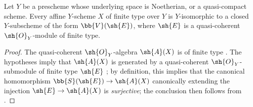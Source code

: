 \begin{proposition}[1.7.15]
\label{2.1.7.15}
Let $Y$ be a prescheme whose underlying space is Noetherian, or a quasi-compact scheme.
Every affine $Y$-scheme $X$ of finite type over $Y$ is $Y$-isomorphic to a closed $Y$-subscheme of the form $\bb{V}(\sh{E})$, where $\sh{E}$ is a quasi-coherent $\sh{O}_Y$-module of finite type.
\end{proposition}

\begin{proof}
\label{proof-2.1.7.15}
The quasi-coherent $\sh{O}_Y$-algebra $\sh{A}(X)$ is of finite type .
The hypotheses imply that $\sh{A}(X)$ is generated by a quasi-coherent $\sh{O}_Y$-submodule of finite type $\sh{E}$ ; by definition, this implies that the canonical homomorphism $\bb{S}(\sh{E})\to\sh{A}(X)$ canonically extending the injection $\sh{E}\to\sh{A}(X)$ is \emph{surjective}; the conclusion then follows from .
\end{proof}

